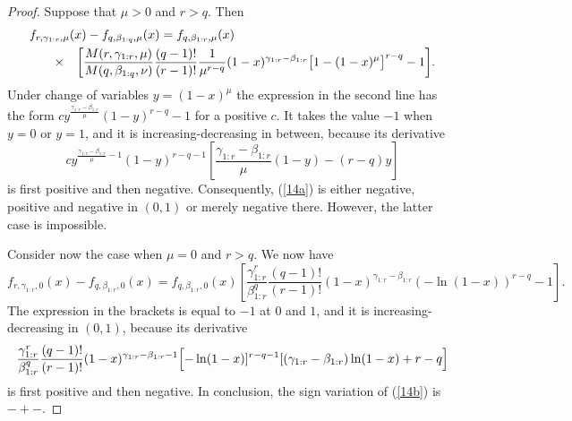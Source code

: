 \documentclass[10pt,a4paper]{amsart}
\begin{document}
\begin{proof}
Suppose that $\mu>0$ and $r>q$. Then
\begin{eqnarray}
\label{14a}
\lefteqn{f_{r, \gamma_{1:r}, \mu} (x) - f_{q, \beta_{1:q}, \mu} (x)
=  f_{q, \beta_{1:r}, \mu} (x)} \nonumber \\
& \qquad\times & \left[
\frac{M(r,\gamma_{1:r},\mu)}{M(q,\beta_{1:q},\nu)}
\frac{(q-1)!}{(r-1)!}\frac{1}{\mu^{r-q}}
(1-x)^{\gamma_{1:r}-\beta_{1:r}} \bigl[1- (1-x)^\mu\bigr]^{r-q}-1\right]\!.
\end{eqnarray}
Under change of variables $y= (1-x)^\mu$ the expression in the second line has the form\linebreak 
$c y^{\frac{\gamma_{1:r}-\beta_{1:r}}{\mu}}(1-y)^{r-q}-1$ for a positive $c$. It takes the value $-1$ when $y=0$ or $y=1$, and it is increasing-decreasing in between, because its derivative
\[
c y^{\frac{\gamma_{1:r}-\beta_{1:r}}{\mu}-1}
(1-y)^{r-q-1}\left[ \frac{\gamma_{1:r}-\beta_{1:r}}{\mu} (1-y) -
(r-q)y \right]
\]
is first positive and then negative.
Consequently, (\ref{14a}) is either negative, positive and negative in $(0,1)$ or merely negative there. However, the latter case is impossible.

\smallskip

Consider now the case when $\mu=0$ and $r>q$. We now have
\begin{equation}
\label{14b}
f_{r, \gamma_{1:r}, 0} (x) - f_{q, \beta_{1:r}, 0} (x)
  =  f_{q, \beta_{1:r}, 0} (x)   \left[ \frac{\gamma_{1:r}^r}{\beta_{1:r}^q}
\frac{(q\!-\!1)!}{(r\!-\!1)!} (1-x)^{\gamma_{1:r}-\beta_{1:r}}
(-\ln (1-x))^{r-q}-1 \right].
\end{equation}
The expression in the brackets is equal to $-1$ at $0$ and $1$, and it is increasing-decreasing in $(0,1)$, because its
derivative
\[
\frac{\gamma_{1:r}^r}{\beta_{1:r}^q}
\frac{(q-1)!}{(r-1)!} (1-x)^{\gamma_{1:r}-\beta_{1:r}-1}
\Bigl[-\ln (1-x)]^{r-q-1}[(\gamma_{1:r}-\beta_{1:r})\ln (1-x) +r-q\Bigr]
\]
is first positive and then negative.  In conclusion, the sign variation of (\ref{14b}) is $-+-$.

\smallskip


\end{proof}
\end{document}
